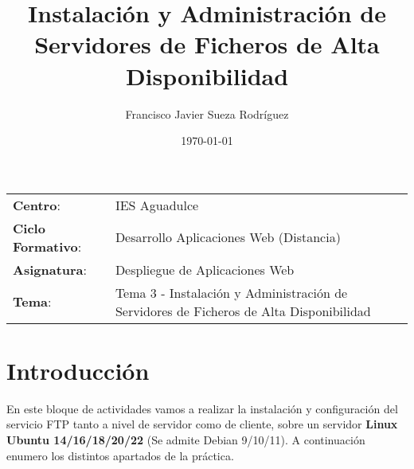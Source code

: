 


\title{
\vspace{10ex}
\normalfont \normalsize
\huge \textbf{Instalación y Administración de Servidores de Ficheros de Alta Disponibilidad}
}
\author{Francisco Javier Sueza Rodríguez}
\date{\normalsize\today}




\maketitle

\thispagestyle{empty}

\vspace{65ex}

\begin{center}
    \begin{tabular}{l l}
        \textbf{Centro}: & IES Aguadulce \\
        \textbf{Ciclo Formativo}: & Desarrollo Aplicaciones Web (Distancia)\\
        \textbf{Asignatura}: & Despliegue de Aplicaciones Web\\
        \textbf{Tema}: & Tema 3 - Instalación y Administración de Servidores de Ficheros de Alta Disponibilidad\\
    \end{tabular}
\end{center}

\newpage

\tableofcontents

\newpage

\listoffigures

\newpage


\section{Introducción}
En este bloque de actividades vamos a realizar la instalación y configuración del servicio FTP tanto a nivel de servidor como de cliente, sobre un servidor \textbf{Linux Ubuntu 14/16/18/20/22} (Se admite Debian 9/10/11). A continuación enumero los distintos apartados de la práctica.

